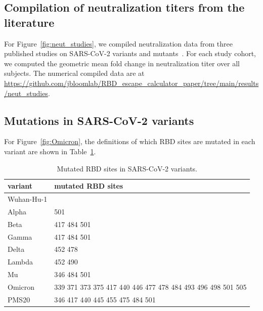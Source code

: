 \documentclass[9pt,twocolumn,twoside]{gsajnl_modified}
\begin{document}
{\subsection{Compilation of neutralization titers from the literature}
For Figure~\ref{fig:neut_studies}, we compiled neutralization data from three published studies on SARS-CoV-2 variants and mutants~\citep{lucas2021impact,uriu2021neutralization,wang2021antibody}.
For each study cohort, we computed the geometric mean fold change in neutralization titer over all subjects.
The numerical compiled data are at \url{https://github.com/jbloomlab/RBD_escape_calculator_paper/tree/main/results/neut_studies}.

\subsection{Mutations in SARS-CoV-2 variants}
For Figure~\ref{fig:Omicron}, the definitions of which RBD sites are mutated in each variant are shown in Table~\ref{tab:variants}.
\begin{table}[h]
{\footnotesize
\begin{tabular}{ll}
\toprule
   variant &                                           mutated RBD sites \\
\midrule
Wuhan-Hu-1 &                                                             \\
     Alpha &                                                         501 \\
      Beta &                                                 417 484 501 \\
     Gamma &                                                 417 484 501 \\
     Delta &                                                     452 478 \\
    Lambda &                                                     452 490 \\
        Mu &                                                 346 484 501 \\
   Omicron & 339 371 373 375 417 440 446 477 478 484 493 496 498 501 505 \\
     PMS20 &                             346 417 440 445 455 475 484 501 \\
\bottomrule
\end{tabular}
}
\caption{Mutated RBD sites in SARS-CoV-2 variants.}
\label{tab:variants}
\end{table}

}
\end{document}
